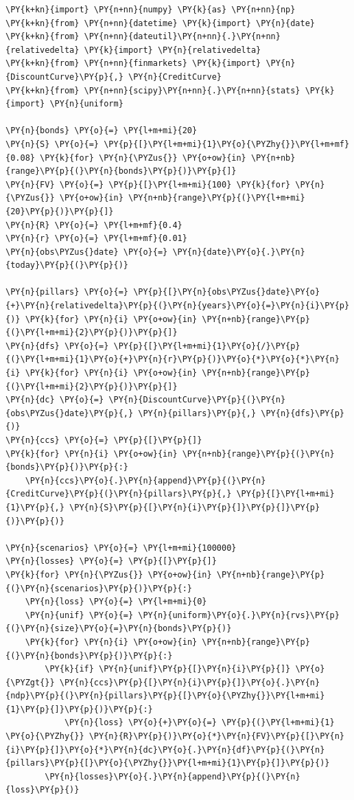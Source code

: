\begin{codebox}
\begin{Verbatim}[commandchars=\\\{\}]
\PY{k+kn}{import} \PY{n+nn}{numpy} \PY{k}{as} \PY{n+nn}{np}
\PY{k+kn}{from} \PY{n+nn}{datetime} \PY{k}{import} \PY{n}{date}
\PY{k+kn}{from} \PY{n+nn}{dateutil}\PY{n+nn}{.}\PY{n+nn}{relativedelta} \PY{k}{import} \PY{n}{relativedelta}
\PY{k+kn}{from} \PY{n+nn}{finmarkets} \PY{k}{import} \PY{n}{DiscountCurve}\PY{p}{,} \PY{n}{CreditCurve}
\PY{k+kn}{from} \PY{n+nn}{scipy}\PY{n+nn}{.}\PY{n+nn}{stats} \PY{k}{import} \PY{n}{uniform}
		
\PY{n}{bonds} \PY{o}{=} \PY{l+m+mi}{20}
\PY{n}{S} \PY{o}{=} \PY{p}{[}\PY{l+m+mi}{1}\PY{o}{\PYZhy{}}\PY{l+m+mf}{0.08} \PY{k}{for} \PY{n}{\PYZus{}} \PY{o+ow}{in} \PY{n+nb}{range}\PY{p}{(}\PY{n}{bonds}\PY{p}{)}\PY{p}{]}
\PY{n}{FV} \PY{o}{=} \PY{p}{[}\PY{l+m+mi}{100} \PY{k}{for} \PY{n}{\PYZus{}} \PY{o+ow}{in} \PY{n+nb}{range}\PY{p}{(}\PY{l+m+mi}{20}\PY{p}{)}\PY{p}{]}
\PY{n}{R} \PY{o}{=} \PY{l+m+mf}{0.4}
\PY{n}{r} \PY{o}{=} \PY{l+m+mf}{0.01}
\PY{n}{obs\PYZus{}date} \PY{o}{=} \PY{n}{date}\PY{o}{.}\PY{n}{today}\PY{p}{(}\PY{p}{)}
		
\PY{n}{pillars} \PY{o}{=} \PY{p}{[}\PY{n}{obs\PYZus{}date}\PY{o}{+}\PY{n}{relativedelta}\PY{p}{(}\PY{n}{years}\PY{o}{=}\PY{n}{i}\PY{p}{)} \PY{k}{for} \PY{n}{i} \PY{o+ow}{in} \PY{n+nb}{range}\PY{p}{(}\PY{l+m+mi}{2}\PY{p}{)}\PY{p}{]}
\PY{n}{dfs} \PY{o}{=} \PY{p}{[}\PY{l+m+mi}{1}\PY{o}{/}\PY{p}{(}\PY{l+m+mi}{1}\PY{o}{+}\PY{n}{r}\PY{p}{)}\PY{o}{*}\PY{o}{*}\PY{n}{i} \PY{k}{for} \PY{n}{i} \PY{o+ow}{in} \PY{n+nb}{range}\PY{p}{(}\PY{l+m+mi}{2}\PY{p}{)}\PY{p}{]}
\PY{n}{dc} \PY{o}{=} \PY{n}{DiscountCurve}\PY{p}{(}\PY{n}{obs\PYZus{}date}\PY{p}{,} \PY{n}{pillars}\PY{p}{,} \PY{n}{dfs}\PY{p}{)}
\PY{n}{ccs} \PY{o}{=} \PY{p}{[}\PY{p}{]}
\PY{k}{for} \PY{n}{i} \PY{o+ow}{in} \PY{n+nb}{range}\PY{p}{(}\PY{n}{bonds}\PY{p}{)}\PY{p}{:}
    \PY{n}{ccs}\PY{o}{.}\PY{n}{append}\PY{p}{(}\PY{n}{CreditCurve}\PY{p}{(}\PY{n}{pillars}\PY{p}{,} \PY{p}{[}\PY{l+m+mi}{1}\PY{p}{,} \PY{n}{S}\PY{p}{[}\PY{n}{i}\PY{p}{]}\PY{p}{]}\PY{p}{)}\PY{p}{)}
		
\PY{n}{scenarios} \PY{o}{=} \PY{l+m+mi}{100000}
\PY{n}{losses} \PY{o}{=} \PY{p}{[}\PY{p}{]}
\PY{k}{for} \PY{n}{\PYZus{}} \PY{o+ow}{in} \PY{n+nb}{range}\PY{p}{(}\PY{n}{scenarios}\PY{p}{)}\PY{p}{:}
    \PY{n}{loss} \PY{o}{=} \PY{l+m+mi}{0}
    \PY{n}{unif} \PY{o}{=} \PY{n}{uniform}\PY{o}{.}\PY{n}{rvs}\PY{p}{(}\PY{n}{size}\PY{o}{=}\PY{n}{bonds}\PY{p}{)}
    \PY{k}{for} \PY{n}{i} \PY{o+ow}{in} \PY{n+nb}{range}\PY{p}{(}\PY{n}{bonds}\PY{p}{)}\PY{p}{:}
        \PY{k}{if} \PY{n}{unif}\PY{p}{[}\PY{n}{i}\PY{p}{]} \PY{o}{\PYZgt{}} \PY{n}{ccs}\PY{p}{[}\PY{n}{i}\PY{p}{]}\PY{o}{.}\PY{n}{ndp}\PY{p}{(}\PY{n}{pillars}\PY{p}{[}\PY{o}{\PYZhy{}}\PY{l+m+mi}{1}\PY{p}{]}\PY{p}{)}\PY{p}{:}
            \PY{n}{loss} \PY{o}{+}\PY{o}{=} \PY{p}{(}\PY{l+m+mi}{1} \PY{o}{\PYZhy{}} \PY{n}{R}\PY{p}{)}\PY{o}{*}\PY{n}{FV}\PY{p}{[}\PY{n}{i}\PY{p}{]}\PY{o}{*}\PY{n}{dc}\PY{o}{.}\PY{n}{df}\PY{p}{(}\PY{n}{pillars}\PY{p}{[}\PY{o}{\PYZhy{}}\PY{l+m+mi}{1}\PY{p}{]}\PY{p}{)} 
        \PY{n}{losses}\PY{o}{.}\PY{n}{append}\PY{p}{(}\PY{n}{loss}\PY{p}{)}
        

\end{Verbatim}
\end{codebox}
